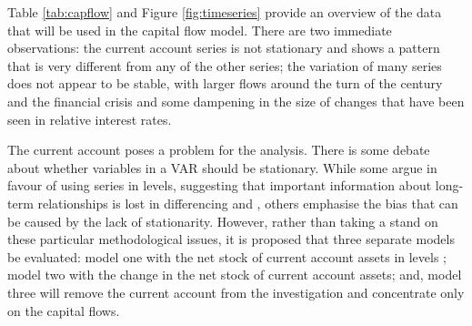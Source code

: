 \documentclass[12pt, a4paper, oneside]{article}\usepackage[]{graphicx}\usepackage[]{color}
\begin{document}
Table \ref{tab:capflow} and Figure \ref{fig:timeseries} provide an overview of the data that will be used in the capital flow model.   There are two immediate observations:  the current account series is not stationary and shows a pattern that is very different from any of the other series; the variation of many series does not appear to be stable, with larger flows around the turn of the century and the financial crisis and some dampening in the size of changes that have been seen in relative interest rates.

The current account poses a problem for the analysis.  There is some debate about whether variables in a VAR should be stationary. While some argue in favour of using series in levels, suggesting that important information about long-term relationships is lost in differencing \citep{Sims1980Macroeconomics} and \citep{Sims1990Unit}, others emphasise the bias that can be caused by the lack of stationarity.  %
However, rather than taking a stand on these particular methodological issues, it is proposed that three separate models be evaluated:  model one with the net stock of current account assets in levels ; model two with the change in the net stock of current account assets; and, model three will remove the current account from the investigation and concentrate only on the capital flows. 
\end{document}
